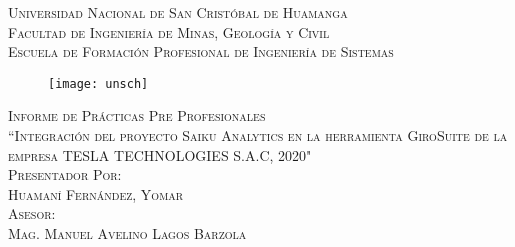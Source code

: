 \newcommand{\mydate}{\formatdate{02}{12}{2020}}
\begin{titlepage}
	\begin{center}
		\textsc{ 
		\Large Universidad Nacional de San Cristóbal de Huamanga\\
		\vspace{5mm}
			Facultad de Ingeniería de Minas, Geología y Civil\\
		\vspace{5mm}
		Escuela de Formación Profesional de Ingeniería de Sistemas\\}
	
			\begin{figure}[h]
				\centering
				\texttt{[image: unsch]}
			\end{figure}
		
		\textsc{ 
			\large Informe de Prácticas Pre Profesionales\\
			\vspace{5mm}
				``Integración del proyecto Saiku Analytics en la herramienta GiroSuite de la empresa TESLA TECHNOLOGIES S.A.C, 2020"\\
			\vspace{1cm}
			Presentador Por:\\
			Huamaní Fernández, Yomar\\	
			\vspace{5mm}
			Asesor:\\
			Mag. Manuel Avelino Lagos Barzola\\
			\vspace{5mm}
			\mydate
		}
	\end{center}
\end{titlepage}